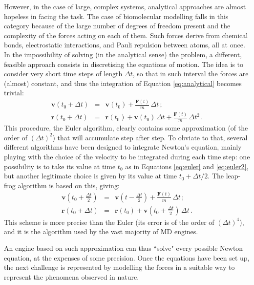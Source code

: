 However, in the case of large, complex systems, analytical approaches are almost hopeless in facing the task. The case of biomolecular modelling falls in this category because of the large number of degrees of freedom present and the complexity of the forces acting on each of them. Such forces derive from chemical bonds, electrostatic interactions, and Pauli repulsion between atoms, all at once. In the impossibility of solving (in the analytical sense) the problem, a different, feasible approach consists in discretising the equations of motion. The idea is to consider very short time steps of length $\Delta t$, so that in such interval the forces are (almost) constant, and thus the integration of Equation \ref{eq:analytical} becomes trivial:
\begin{eqnarray} \label{eq:euler}
\mathbf{v}(t_0 + \Delta t) &=& \mathbf{v}(t_0) + \frac{\mathbf{F}(t)}{m} \, \Delta t \,; \\
\mathbf{r}(t_0 + \Delta t) &=& \mathbf{r}(t_0) + \mathbf{v}(t_0) \, \Delta t + \frac{\mathbf{F}(t)}{m} \, \Delta t^2 \,. \label{eq:euler2}
\end{eqnarray}
This procedure, the Euler algorithm, clearly contains some approximation (of the order of $(\Delta t)^2$) that will accumulate step after step. To obviate to that, several different algorithms have been designed to integrate Newton's equation, mainly playing with the choice of the velocity to be integrated during each time step: one possibility is to take its value at time $t_0$ as in Equations \ref{eq:euler} and \ref{eq:euler2}, but another legitimate choice is given by its value at time $t_0 + \Delta t/2$. The leap-frog algorithm is based on this, giving:
\begin{eqnarray}
\mathbf{v}\left(t_0 + \frac{\Delta t}{2}\right) &=& \mathbf{v}\left(t - \frac{\Delta t}{2}\right) + \frac{\mathbf{F}(t)}{m} \, \Delta t \, ; \\
\mathbf{r}(t_0 + \Delta t) &=& \mathbf{r}(t_0) + \mathbf{v}\left(t_0 + \frac{\Delta t}{2}\right) \, \Delta t \, .
\end{eqnarray}
This scheme is more precise than the Euler (its error is of the order of $(\Delta t)^4$), and it is the algorithm used by the vast majority of MD engines.

An engine based on such approximation can thus ``solve" every possible Newton equation, at the expenses of some precision. Once the equations have been set up, the next challenge is represented by modelling the forces in a suitable way to represent the phenomena observed in nature.

